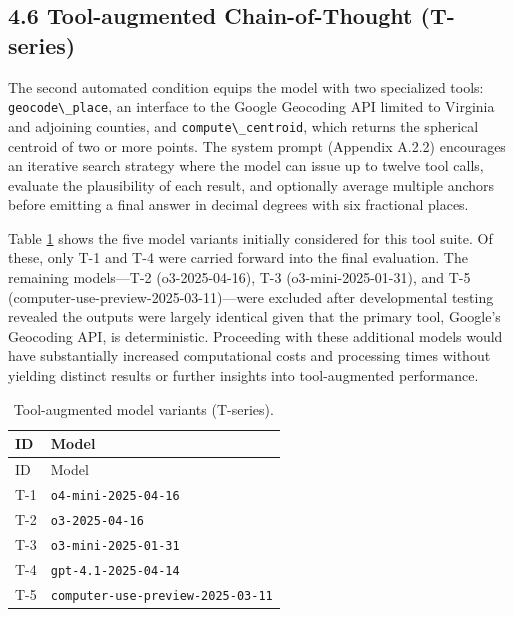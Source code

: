 \documentclass[
  10pt,
  twocolumn]{article}
\begin{document}
\subsection{4.6 Tool-augmented Chain-of-Thought
(T-series)}\label{tool-augmented-chain-of-thought-t-series}

The second automated condition equips the model with two specialized
tools: \passthrough{\lstinline!geocode\_place!}, an interface to the
Google Geocoding API limited to Virginia and adjoining counties, and
\passthrough{\lstinline!compute\_centroid!}, which returns the spherical
centroid of two or more points. The system prompt (Appendix A.2.2)
encourages an iterative search strategy where the model can issue up to
twelve tool calls, evaluate the plausibility of each result, and
optionally average multiple anchors before emitting a final answer in
decimal degrees with six fractional places.

Table \ref{tbl:tmodels} shows the five model variants initially
considered for this tool suite. Of these, only T-1 and T-4 were carried
forward into the final evaluation. The remaining models---T-2
(o3-2025-04-16), T-3 (o3-mini-2025-01-31), and T-5
(computer-use-preview-2025-03-11)---were excluded after developmental
testing revealed the outputs were largely identical given that the
primary tool, Google's Geocoding API, is deterministic. Proceeding with
these additional models would have substantially increased computational
costs and processing times without yielding distinct results or further
insights into tool-augmented performance.

\begin{longtable}[]{@{}ll@{}}
\caption{\label{tbl:tmodels}Tool-augmented model variants
(T-series).}\tabularnewline
\toprule\noalign{}
ID & Model \\
\midrule\noalign{}
\endfirsthead
\toprule\noalign{}
ID & Model \\
\midrule\noalign{}
\endhead
\bottomrule\noalign{}
\endlastfoot
T-1 & \passthrough{\lstinline!o4-mini-2025-04-16!} \\
T-2 & \passthrough{\lstinline!o3-2025-04-16!} \\
T-3 & \passthrough{\lstinline!o3-mini-2025-01-31!} \\
T-4 & \passthrough{\lstinline!gpt-4.1-2025-04-14!} \\
T-5 & \passthrough{\lstinline!computer-use-preview-2025-03-11!} \\
\end{longtable}
\end{document}
